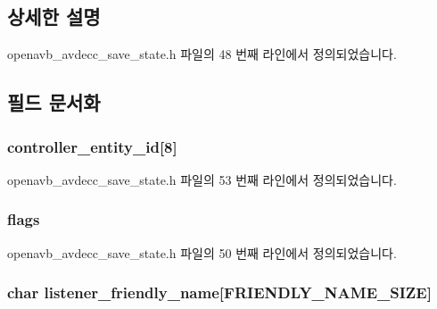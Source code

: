 \subsection{상세한 설명}


openavb\+\_\+avdecc\+\_\+save\+\_\+state.\+h 파일의 48 번째 라인에서 정의되었습니다.



\subsection{필드 문서화}
\subsubsection[{\texorpdfstring{controller\+\_\+entity\+\_\+id}{controller_entity_id}}]{ controller\+\_\+entity\+\_\+id\mbox{[}8\mbox{]}}\hypertarget{structopenavb__saved__state_a8b74ba582b9c19e1f2e475925f7cfb2f}{}\label{structopenavb__saved__state_a8b74ba582b9c19e1f2e475925f7cfb2f}


openavb\+\_\+avdecc\+\_\+save\+\_\+state.\+h 파일의 53 번째 라인에서 정의되었습니다.

\subsubsection[{\texorpdfstring{flags}{flags}}]{ flags}\hypertarget{structopenavb__saved__state_a492b33861e809623846e5256d271bc78}{}\label{structopenavb__saved__state_a492b33861e809623846e5256d271bc78}


openavb\+\_\+avdecc\+\_\+save\+\_\+state.\+h 파일의 50 번째 라인에서 정의되었습니다.

\subsubsection[{\texorpdfstring{listener\+\_\+friendly\+\_\+name}{listener_friendly_name}}]{\setlength{\rightskip}{0pt plus 5cm}char listener\+\_\+friendly\+\_\+name\mbox{[}{\bf F\+R\+I\+E\+N\+D\+L\+Y\+\_\+\+N\+A\+M\+E\+\_\+\+S\+I\+ZE}\mbox{]}}\hypertarget{structopenavb__saved__state_aeaaf1a5eb8e190e9385389bc81aadb39}{}\label{structopenavb__saved__state_aeaaf1a5eb8e190e9385389bc81aadb39}


